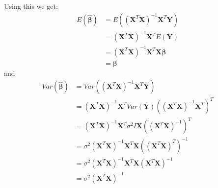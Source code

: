 \documentclass{article}
\begin{document}
Using this we get:
\begin{align*}
    E(\mathbf{\hat{\beta}}) & = E((\mathbf{X}^T \mathbf{X})^{-1} \mathbf{X}^T \mathbf{Y})             \\
                            & = (\mathbf{X}^T \mathbf{X})^{-1} \mathbf{X}^T E(\mathbf{Y})             \\
                            & = (\mathbf{X}^T \mathbf{X})^{-1} \mathbf{X}^T \mathbf{X} \mathbf{\beta} \\
                            & = \mathbf{\beta}
\end{align*}
and
\begin{align*}
    Var(\mathbf{\hat{\beta}}) & = Var((\mathbf{X}^T \mathbf{X})^{-1} \mathbf{X}^T \mathbf{Y})                                                              \\
                              & = (\mathbf{X}^T \mathbf{X})^{-1} \mathbf{X}^T Var(\mathbf{Y}) \left( (\mathbf{X}^T \mathbf{X})^{-1} \mathbf{X}^T \right)^T \\
                              & = (\mathbf{X}^T \mathbf{X})^{-1} \mathbf{X}^T \sigma^2 I \mathbf{X} \left( (\mathbf{X}^T \mathbf{X})^{-1} \right)^T        \\
                              & = \sigma^2 (\mathbf{X}^T \mathbf{X})^{-1} \mathbf{X}^T \mathbf{X} \left((\mathbf{X}^T \mathbf{X})^T \right)^{-1}           \\
                              & = \sigma^2 (\mathbf{X}^T \mathbf{X})^{-1} \mathbf{X}^T \mathbf{X} (\mathbf{X}^T \mathbf{X})^{-1}                           \\
                              & = \sigma^2 (\mathbf{X}^T \mathbf{X})^{-1}
\end{align*}
\end{document}
